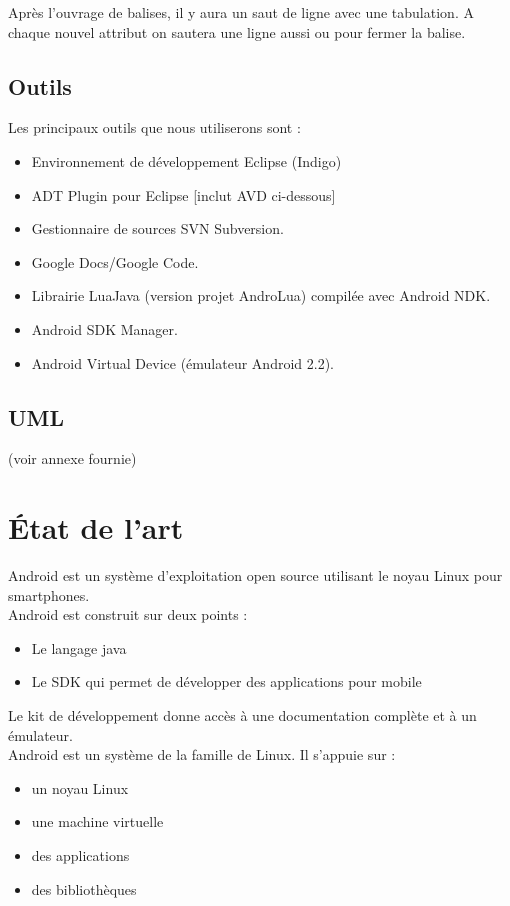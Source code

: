 \documentclass[a4paper]{report}
\begin{document}
		Après l'ouvrage de balises, il y aura un saut de ligne avec une tabulation. A chaque nouvel attribut on sautera une ligne aussi ou pour fermer la balise.

	\section{Outils}

		Les principaux outils que nous utiliserons sont :
		\begin{itemize}
			\item Environnement de développement Eclipse (Indigo)
			\item ADT Plugin pour Eclipse [inclut AVD ci-dessous]
			\item Gestionnaire de sources SVN Subversion.
			\item Google Docs/Google Code.
			\item Librairie LuaJava (version projet AndroLua) compilée avec Android NDK.
			\item Android SDK Manager.
			\item Android Virtual Device (émulateur Android 2.2).
		\end{itemize}
	\section{UML}
	(voir annexe fournie)











\chapter{État de l'art}
	Android est un système d’exploitation open source utilisant le noyau Linux pour smartphones.\\
	Android est construit sur deux points :\\
	\begin{itemize}
	  	\item Le langage java
	    \item Le SDK qui permet de développer des applications pour mobile
	\end{itemize}
	Le kit de développement donne accès à une documentation complète et à un émulateur.\\
	Android est un système de la famille de Linux. Il s’appuie sur :\\
	\begin{itemize}
	   	\item un noyau Linux
	   	\item une machine virtuelle
	   	\item des applications
	   	\item des bibliothèques
	\end{itemize}
\end{document}
